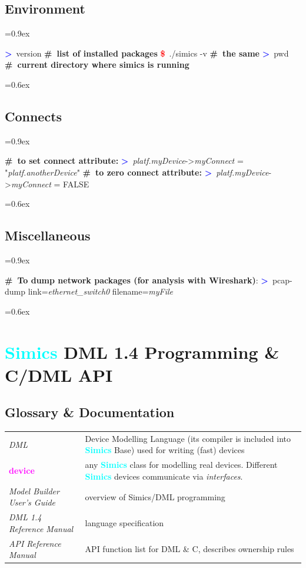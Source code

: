 \documentclass[8pt]{extarticle}
\newenvironment{code}[1][]{%
\begin{prebox}[#1]\obeylines%
\fontdimen2\font=0.9ex%
}{%
\end{prebox}%
\fontdimen2\font=0.6ex%
}
\newcommand{\prompt}{\textcolor{red}{\textbf{\$}\ }}
\newcommand{\sprompt}{\textcolor{blue}{\textbf{>}\ }}
\newcommand{\kw}[1]{\textcolor{magenta}{\textbf{#1}}}
\newcommand{\cmtcommon}[1]{\textcolor{Sepia}{\textbf{#1}}}
\newcommand{\cmt}[1]{\cmtcommon{\#\ #1}}
\newcommand{\p}[1]{\textit{\large#1}}
\newcommand{\Simics}{\textcolor{cyan}{\textbf{Simics}}}
\newlength{\MyLen}
\begin{document}
\begin{multicols*}{3}
\subsection{Environment}
\begin{code}
    \sprompt version  \cmt{list of installed packages}
    \prompt ./simics -v \cmt{the same}
    \sprompt pwd \cmt{current directory where simics is running}
\end{code}


\subsection{Connects}

\begin{code}
    \cmt{to set connect attribute:}
    \sprompt \p{platf.myDevice}->\p{myConnect} = "\p{platf.anotherDevice}"
    \cmt{to zero connect attribute:}
    \sprompt \p{platf.myDevice}->\p{myConnect} = FALSE
\end{code}

\subsection{Miscellaneous}
\begin{code}
    \cmt{To dump network packages (for analysis with Wireshark)}:
    \sprompt pcap-dump link=\p{ethernet_switch0} filename=\p{myFile}
\end{code}

\newpage

\section{\Simics{} DML 1.4 Programming \& C/DML API}

\subsection{Glossary \& Documentation}
    \begin{tabular}{p{\the\MyLen}p{\linewidth-\the\MyLen-0.8cm}}
        \textit{DML}         & Device Modelling Language (its compiler 
        is included into \Simics{} Base) used for writing (fast) devices
        \\
        \kw{device}          & any \Simics{} class for modelling real
        devices. Different \Simics{} devices communicate via \textit{interfaces}.
        \\
        \textit{Model Builder User’s Guide} & overview of Simics/DML
        programming \\
        \textit{DML 1.4 Reference Manual} & language specification \\
        \textit{API Reference Manual} & API function list for DML \& C,
        describes ownership rules
    \end{tabular}


\end{multicols*}
\end{document}
